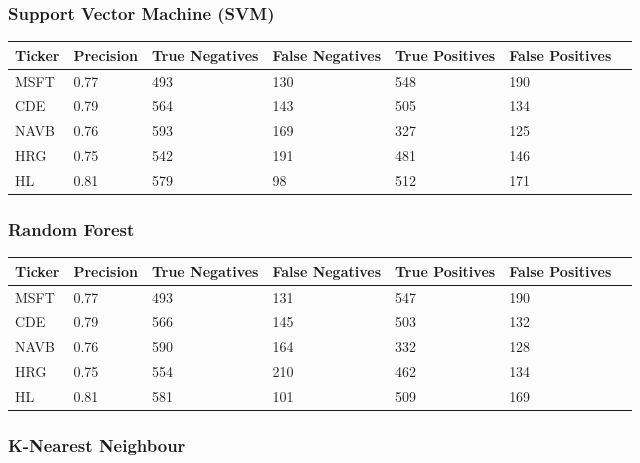 \subsubsection{Support Vector Machine (SVM)}

\begin{center}
    \begin{tabular}{ | l | l | l | | l | l | l | p{5cm} |}
    \hline
    Ticker & Precision & True Negatives & False Negatives & True Positives & False Positives \\ \hline
    MSFT & 0.77 & 493 & 130 & 548 & 190 \\ \hline
    CDE & 0.79 & 564 & 143 & 505 & 134 \\ \hline
    NAVB & 0.76 & 593 & 169 & 327 & 125 \\ \hline
    HRG & 0.75 & 542 & 191 & 481 & 146 \\ \hline
    HL & 0.81 & 579 & 98 & 512 & 171 \\
    \hline
    \end{tabular}
    \label{table:nonfloat}
\end{center}

\subsubsection{Random Forest}

\begin{center}    
    \begin{tabular}{ | l | l | l | | l | l | l | p{5cm} |}
    \hline
    Ticker & Precision & True Negatives & False Negatives & True Positives & False Positives \\ \hline
    MSFT & 0.77 & 493 & 131 & 547 & 190 \\ \hline
    CDE & 0.79 & 566 & 145 & 503 & 132 \\ \hline
    NAVB & 0.76 & 590 & 164 & 332 & 128 \\ \hline
    HRG & 0.75 & 554 & 210 & 462 & 134 \\ \hline
    HL & 0.81 & 581 & 101 & 509 & 169 \\
    \hline
    \end{tabular}
    \label{table:nonfloat}
\end{center}

\subsubsection{K-Nearest Neighbour}


